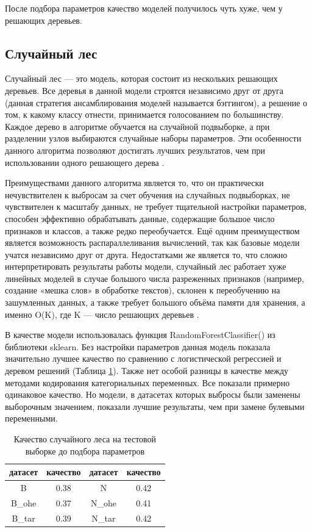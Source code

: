 \documentclass[14pt]{mmcs_article}
\begin{document}
После подбора параметров качество моделей получилось чуть хуже, чем у решающих деревьев.


\subsection{Случайный лес}

Случайный лес --- это модель, которая состоит из нескольких решающих деревьев. Все деревья в данной модели строятся независимо друг от друга (данная стратегия ансамблирования моделей называется бэггингом), а решение о том, к какому классу отнести, принимается голосованием по большинству. Каждое дерево в алгоритме обучается на случайной подвыборке, а при разделении узлов выбираются случайные наборы параметров. Эти особенности данного алгоритма позволяют достигать лучших результатов, чем при использовании одного решающего дерева \cite{lib:randomforest}.

Преимуществами данного алгоритма является то, что он практически нечувствителен к выбросам за счет обучения на случайных подвыборках, не чувствителен к масштабу данных, не требует тщательной настройки параметров, способен эффективно обрабатывать данные, содержащие большое число признаков и классов, а также редко переобучается. Ещё одним преимуществом является возможность распараллеливания вычислений, так как базовые модели учатся независимо друг от друга. Недостатками же является то, что сложно интерпретировать результаты работы модели, случайный лес работает хуже линейных моделей в случае большого числа разреженных признаков (например, создание «мешка слов» в обработке текстов), склонен к переобучению на зашумленных данных, а также требует большого объёма памяти для хранения, а именно O(K), где K ---  число решающих деревьев \cite{lib:randomforest2}.

В качестве модели использовалась функция RandomForestClassifier() из библиотеки sklearn. Без настройки параметров данная модель показала значительно лучшее качество по сравнению с логистической регрессией и деревом решений (Таблица \ref{models:table5}). Также нет особой разницы в качестве между методами кодирования категориальных переменных. Все показали примерно одинаковое качество. Но модели, в датасетах которых выбросы были заменены выборочным значением, показали лучшие результаты, чем при замене булевыми переменными.

\begin{table}[H]
	\centering
	\caption{Качество случайного леса на тестовой выборке до подбора параметров}\label{models:table5}
	\begin{tabular}{cccc}
		\hline
		датасет & качество	& датасет & качество \\
		\hline
		B &	0.38 &	N &	0.42 \\
		B\_ohe & 0.37 &	N\_ohe & 0.41\\
		B\_tar & 0.39 & N\_tar & 0.42 \\
		\hline
	\end{tabular}
\end{table}
\end{document}
